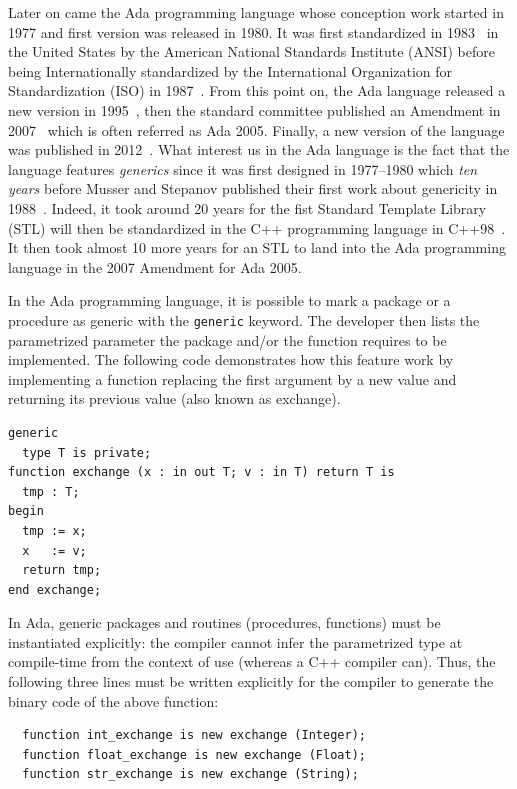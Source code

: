 Later on came the Ada programming language whose conception work started in 1977 and first version was released in 1980.
It was first standardized in 1983~\parencite{ansi.1983.ada} in the United States by the American National Standards
Institute (ANSI) before being Internationally standardized by the International Organization for Standardization (ISO)
in 1987~\parencite{iso.1987.ada}. From this point on, the Ada language released a new version in
1995~\parencite{iso.1995.ada,iso.1995.ada.corr}, then the standard committee published an Amendment in
2007~\parencite{iso.1995.ada.amend} which is often referred as Ada 2005. Finally, a new version of the language was
published in 2012~\parencite{iso.2012.ada,iso.2012.ada.corr}. What interest us in the Ada language is the fact that the
language features \emph{generics} since it was first designed in 1977--1980 which \emph{ten years} before Musser and
Stepanov published their first work about genericity in 1988~\parencite{musser.1988.generic}. Indeed, it took around 20
years for the fist Standard Template Library (STL) will then be standardized in the C++ programming language in
C++98~\parencite{iso.1998.cpp}. It then took almost 10 more years for an STL to land into the Ada programming language
in the 2007 Amendment for Ada 2005.

In the Ada programming language, it is possible to mark a package or a procedure as generic with the \texttt{generic}
keyword. The developer then lists the parametrized parameter the package and/or the function requires to be implemented.
The following code demonstrates how this feature work by implementing a function replacing the first argument by a new
value and returning its previous value (also known as exchange).

\begin{verbatim}
generic
  type T is private;
function exchange (x : in out T; v : in T) return T is
  tmp : T;
begin
  tmp := x;
  x   := v;
  return tmp;
end exchange;
\end{verbatim}

In Ada, generic packages and routines (procedures, functions) must be instantiated explicitly: the compiler cannot infer
the parametrized type at compile-time from the context of use (whereas a C++ compiler can). Thus, the following three
lines must be written explicitly for the compiler to generate the binary code of the above function:
\begin{verbatim}
  function int_exchange is new exchange (Integer);
  function float_exchange is new exchange (Float);
  function str_exchange is new exchange (String);
\end{verbatim}


